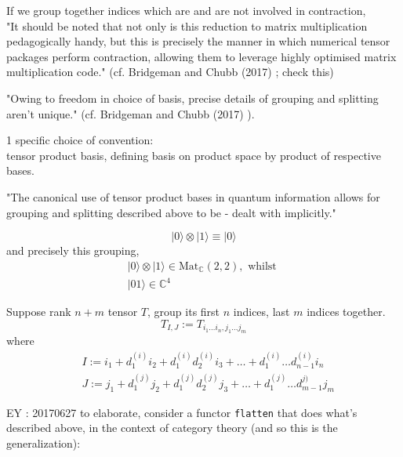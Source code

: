\documentclass[10pt]{amsart}
\begin{document}
\begin{multicols*}{2}
If we group together indices which are and are not involved in contraction, \\
"It should be noted that not only is this reduction to matrix multiplication pedagogically handy, but this is precisely the manner in which numerical tensor packages perform contraction, allowing them to leverage highly optimised matrix multiplication code." (cf. Bridgeman and Chubb (2017) \cite{BrCh2017}; check this)

"Owing to freedom in choice of basis, precise details of grouping and splitting aren't unique." (cf. Bridgeman and Chubb (2017) \cite{BrCh2017}).  

1 specific choice of convention:  \\
tensor product basis, defining basis on product space by product of respective bases.  

"The canonical use of tensor product bases in quantum information allows for grouping and splitting described above to be - dealt with implicitly."  


\begin{equation}
 | 0 \rangle \otimes | 1 \rangle \equiv | 0 \rangle 
\end{equation} and precisely this grouping, 
\begin{equation}
\begin{gathered}
	| 0 \rangle \otimes | 1 \rangle \in \text{Mat}_{\mathbb{C}}(2,2), \text{ whilst } \\ 
 | 0 1 \rangle \in \mathbb{C}^4  
\end{gathered}
\end{equation}

Suppose rank $n+m$ tensor $T$, group its first $n$ indices, last $m$ indices together.
\[
T_{I,J} := T_{i_1\dots i_n,j_1\dots j_m}
\]
where 
\[
\begin{aligned}
	& I := i_1 + d_1^{(i)} i_2 + d_1^{(i)}  d_2^{(i)} i_3 + \dots + d_1^{(i)} \dots d_{n-1}^{(i)} i_n \\ 
	& J := j_1 + d_1^{(j)} j_2 + d_1^{(j)}  d_2^{(j)} j_3 + \dots + d_1^{(j)} \dots d_{m-1}^{j)} j_m 
\end{aligned}
\]

EY : 20170627 to elaborate, consider a functor \verb|flatten| that does what's described above, in the context of category theory (and so this is the generalization):


\end{multicols*}
\end{document}
